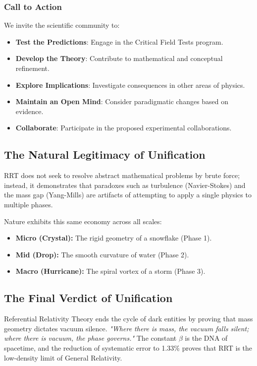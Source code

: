 \documentclass[12pt,a4paper]{article}
\begin{document}
\subsubsection{Call to Action}
We invite the scientific community to:
\begin{itemize}
    \item \textbf{Test the Predictions}: Engage in the Critical Field Tests program.
    \item \textbf{Develop the Theory}: Contribute to mathematical and conceptual refinement.
    \item \textbf{Explore Implications}: Investigate consequences in other areas of physics.
    \item \textbf{Maintain an Open Mind}: Consider paradigmatic changes based on evidence.
    \item \textbf{Collaborate}: Participate in the proposed experimental collaborations.
\end{itemize}

\subsection{The Natural Legitimacy of Unification}
RRT does not seek to resolve abstract mathematical problems by brute force; instead, it demonstrates that paradoxes such as turbulence (Navier-Stokes) and the mass gap (Yang-Mills) are artifacts of attempting to apply a single physics to multiple phases.

Nature exhibits this same economy across all scales:
\begin{itemize}
    \item \textbf{Micro (Crystal):} The rigid geometry of a snowflake (Phase 1).
    \item \textbf{Mid (Drop):} The smooth curvature of water (Phase 2).
    \item \textbf{Macro (Hurricane):} The spiral vortex of a storm (Phase 3).
\end{itemize}

\subsection{The Final Verdict of Unification}
Referential Relativity Theory ends the cycle of dark entities by proving that mass geometry dictates vacuum silence. \textit{"Where there is mass, the vacuum falls silent; where there is vacuum, the phase governs."} The constant $\beta$ is the DNA of spacetime, and the reduction of systematic error to 1.33\% proves that RRT is the low-density limit of General Relativity.
\end{document}

